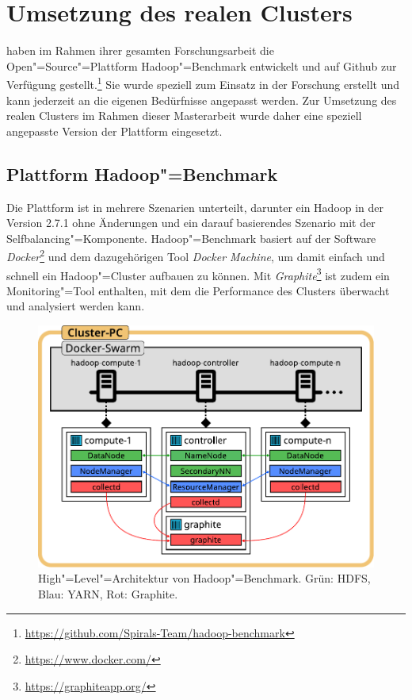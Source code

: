 \section{Umsetzung des realen Clusters}\label{sec:aufbauCluster}

\citeauthor{zhang2016} haben im Rahmen ihrer gesamten Forschungsarbeit die Open"=Source"=Plattform Hadoop"=Benchmark entwickelt und auf Github zur Verfügung gestellt.\footnote{\url{https://github.com/Spirals-Team/hadoop-benchmark}}
Sie wurde speziell zum Einsatz in der Forschung erstellt und kann jederzeit an die eigenen Bedürfnisse angepasst werden.
Zur Umsetzung des realen Clusters im Rahmen dieser Masterarbeit wurde daher eine speziell angepasste Version der Plattform eingesetzt.

\subsection{Plattform Hadoop"=Benchmark}\label{sec:hadoopBenchmark}

Die Plattform ist in mehrere Szenarien unterteilt, darunter ein Hadoop in der Version 2.7.1 ohne Änderungen und ein darauf basierendes Szenario mit der Selfbalancing"=Komponente.
Hadoop"=Benchmark basiert auf der Software \emph{Docker}\footnote{\url{https://www.docker.com/}} und dem dazugehörigen Tool \emph{Docker Machine}, um damit einfach und schnell ein Hadoop"=Cluster aufbauen zu können.
Mit \emph{Graphite}\footnote{\url{https://graphiteapp.org/}} ist zudem ein Monitoring"=Tool enthalten, mit dem die Performance des Clusters überwacht und analysiert werden kann.

\begin{figure}
    \includegraphics{./images/hadoopBenchmarkArch.pdf}
    \caption[High"=Level"=Architektur von Hadoop"=Benchmark]
    {High"=Level"=Architektur von Hadoop"=Benchmark.
        Grün: \ac{HDFS}, Blau: YARN, Rot: Graphite.
        }
    \label{fig:hadoopBenchmarkArchitecture}
\end{figure}

